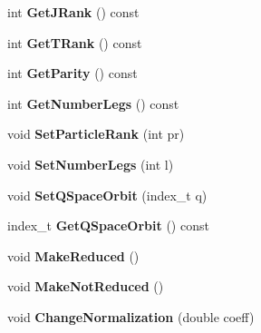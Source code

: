 \begin{DoxyCompactItemize}
\item 
\hypertarget{classOperator_a5f12467caae7d72bad32ea5b7c378899}{int {\bfseries Get\-J\-Rank} () const }\label{classOperator_a5f12467caae7d72bad32ea5b7c378899}

\item 
\hypertarget{classOperator_af01419ad8d7a4097f5520ae6d533e93f}{int {\bfseries Get\-T\-Rank} () const }\label{classOperator_af01419ad8d7a4097f5520ae6d533e93f}

\item 
\hypertarget{classOperator_a7b3d8e2ca9f0ba631b59220cf04dbe39}{int {\bfseries Get\-Parity} () const }\label{classOperator_a7b3d8e2ca9f0ba631b59220cf04dbe39}

\item 
\hypertarget{classOperator_a663dc26d0a2509061a353f4880215043}{int {\bfseries Get\-Number\-Legs} () const }\label{classOperator_a663dc26d0a2509061a353f4880215043}

\item 
\hypertarget{classOperator_a77eb97b1309a1c4e20101217903b9771}{void {\bfseries Set\-Particle\-Rank} (int pr)}\label{classOperator_a77eb97b1309a1c4e20101217903b9771}

\item 
\hypertarget{classOperator_ab2b1fee0aae999079dc1f48a444138f0}{void {\bfseries Set\-Number\-Legs} (int l)}\label{classOperator_ab2b1fee0aae999079dc1f48a444138f0}

\item 
\hypertarget{classOperator_a665014c5ea870f66749623c180a8cbe1}{void {\bfseries Set\-Q\-Space\-Orbit} (index\-\_\-t q)}\label{classOperator_a665014c5ea870f66749623c180a8cbe1}

\item 
\hypertarget{classOperator_af78e6526e8c18cdcc5e49e903ba154a2}{index\-\_\-t {\bfseries Get\-Q\-Space\-Orbit} () const }\label{classOperator_af78e6526e8c18cdcc5e49e903ba154a2}

\item 
\hypertarget{classOperator_ad2ec2d4cf6d17b1b7b7afc86bc03c6ed}{void {\bfseries Make\-Reduced} ()}\label{classOperator_ad2ec2d4cf6d17b1b7b7afc86bc03c6ed}

\item 
\hypertarget{classOperator_add4e26b5eb6534daed5cd40899456ed0}{void {\bfseries Make\-Not\-Reduced} ()}\label{classOperator_add4e26b5eb6534daed5cd40899456ed0}

\item 
\hypertarget{classOperator_a4a4ebafd34f06272c1b207d61a5cfd2d}{void {\bfseries Change\-Normalization} (double coeff)}\label{classOperator_a4a4ebafd34f06272c1b207d61a5cfd2d}


\end{DoxyCompactItemize}
